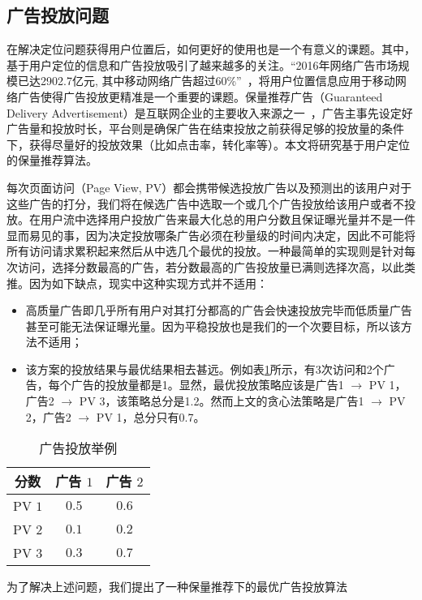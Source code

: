 \subsection{广告投放问题}

在解决定位问题获得用户位置后，如何更好的使用也是一个有意义的课题。其中，基于用户定位的信息和广告投放吸引了越来越多的关注。“2016年网络广告市场规模已达2902.7亿元, 其中移动网络广告超过60\%”~\cite{赵杨2018基于机器学习混合算法的}，将用户位置信息应用于移动网络广告使得广告投放更精准是一个重要的课题。保量推荐广告（Guaranteed Delivery Advertisement）是互联网企业的主要收入来源之一~\cite{korula2016optimizing, mcafee2013maximally}，广告主事先设定好广告量和投放时长，平台则是确保广告在结束投放之前获得足够的投放量的条件下，获得尽量好的投放效果（比如点击率，转化率等）。本文将研究基于用户定位的保量推荐算法。

每次页面访问（Page  View, PV）都会携带候选投放广告以及预测出的该用户对于这些广告的打分，我们将在候选广告中选取一个或几个广告投放给该用户或者不投放。在用户流中选择用户投放广告来最大化总的用户分数且保证曝光量并不是一件显而易见的事，因为决定投放哪条广告必须在秒量级的时间内决定，因此不可能将所有访问请求累积起来然后从中选几个最优的投放。一种最简单的实现则是针对每次访问，选择分数最高的广告，若分数最高的广告投放量已满则选择次高，以此类推。因为如下缺点，现实中这种实现方式并不适用：
\begin{itemize}
	\item 高质量广告即几乎所有用户对其打分都高的广告会快速投放完毕而低质量广告甚至可能无法保证曝光量。因为平稳投放也是我们的一个次要目标，所以该方法不适用；
	\item 该方案的投放结果与最优结果相去甚远。例如表\ref{tab:eoa}所示，有3次访问和2个广告，每个广告的投放量都是1。显然，最优投放策略应该是广告1 $\rightarrow$ PV 1，广告2 $\rightarrow$ PV 3，该策略总分是1.2。然而上文的贪心法策略是广告1 $\rightarrow$ PV 2，广告2 $\rightarrow$ PV 1，总分只有0.7。
\end{itemize}
\begin{table}[b]
	\centering
	\caption{广告投放举例}
	\label{tab:eoa}
	\begin{tabular}{ccc}
		\toprule
		分数 & 广告 $1$ & 广告 $2$ \\
		\midrule
		PV $1$ & $0.5$ & $0.6$ \\
		\midrule
		PV $2$ & $0.1$ & $0.2$ \\
		\midrule
		PV $3$ & $0.3$ & $0.7$ \\
		\bottomrule
	\end{tabular}
\end{table}
为了解决上述问题，我们提出了一种保量推荐下的最优广告投放算法

